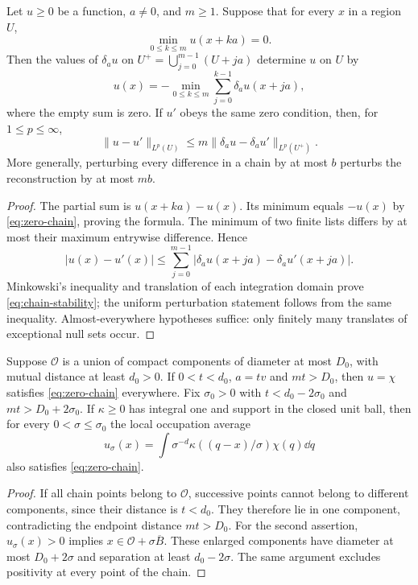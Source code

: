 \begin{theorem}\label{thm:chain}
Let $u\ge0$ be a function, $a\ne0$, and $m\ge1$. Suppose that for every
$x$ in a region $U$,
\begin{equation}\label{eq:zero-chain}
                 \min_{0\le k\le m}u(x+ka)=0.
\end{equation}
Then the values of $\delta_a u$ on
$U^+=\bigcup_{j=0}^{m-1}(U+ja)$ determine $u$ on $U$ by
\begin{equation}\label{eq:min-inverse}
 u(x)=-\min_{0\le k\le m}\sum_{j=0}^{k-1}\delta_a u(x+ja),
\end{equation}
where the empty sum is zero. If $u'$ obeys the same zero condition,
then, for $1\le p\le\infty$,
\begin{equation}\label{eq:chain-stability}
 \|u-u'\|_{L^p(U)}\le
       m\|\delta_a u-\delta_a u'\|_{L^p(U^+)}.
\end{equation}
More generally, perturbing every difference in a chain by at most $b$
perturbs the reconstruction by at most $mb$.
\end{theorem}
\begin{proof}
The partial sum is $u(x+ka)-u(x)$. Its minimum equals $-u(x)$ by
\eqref{eq:zero-chain}, proving the formula. The minimum of two finite
lists differs by at most their maximum entrywise difference. Hence
\[
 |u(x)-u'(x)|\le
   \sum_{j=0}^{m-1}|\delta_a u(x+ja)-\delta_a u'(x+ja)|.
\]
Minkowski's inequality and translation of each integration domain prove
\eqref{eq:chain-stability}; the uniform perturbation statement follows
from the same inequality. Almost-everywhere hypotheses suffice: only
finitely many translates of exceptional null sets occur.
\end{proof}

\begin{lemma}\label{lem:zero}
Suppose $\mathcal O$ is a union of compact components of diameter at
most $D_0$, with mutual distance at least $d_0>0$. If
$0<t<d_0$, $a=tv$ and $mt>D_0$, then $u=\chi$ satisfies
\eqref{eq:zero-chain} everywhere.
Fix $\sigma_0>0$ with $t<d_0-2\sigma_0$ and
$mt>D_0+2\sigma_0$. If $\kappa\ge0$ has integral one and support
in the closed unit ball, then for every $0<\sigma\le\sigma_0$ the
local occupation average
\begin{equation}\label{eq:occupation}
 u_\sigma(x)=\int \sigma^{-d}\kappa((q-x)/\sigma)\chi(q)\dd q
\end{equation}
also satisfies \eqref{eq:zero-chain}.
\end{lemma}
\begin{proof}
If all chain points belong to $\mathcal O$, successive points cannot
belong to different components, since their distance is $t<d_0$.
They therefore lie in one component, contradicting the endpoint distance
$mt>D_0$. For the second assertion, $u_\sigma(x)>0$ implies
$x\in\mathcal O+\sigma\overline B$. These enlarged components have
diameter at most $D_0+2\sigma$ and separation at least $d_0-2\sigma$.
The same argument excludes positivity at every point of the chain.
\end{proof}


